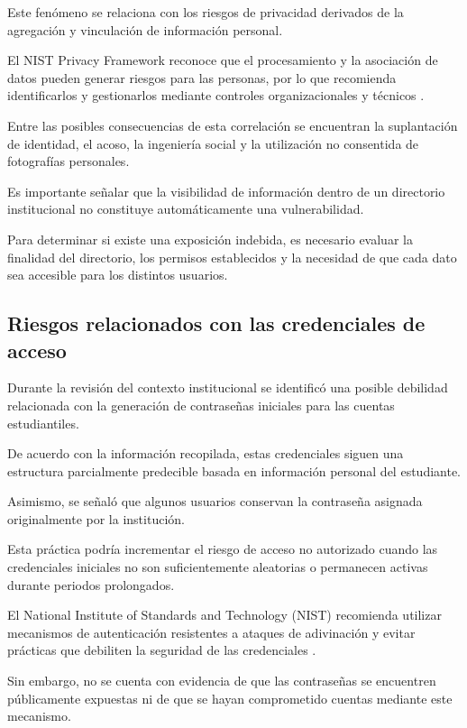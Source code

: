 \documentclass[12pt]{article}
\begin{document}
Este fenómeno se relaciona con los riesgos
de privacidad derivados de la agregación
y vinculación de información personal.

El NIST Privacy Framework reconoce
que el procesamiento y la asociación
de datos pueden generar riesgos para
las personas, por lo que recomienda
identificarlos y gestionarlos mediante
controles organizacionales y técnicos
\parencite{nistprivacy}.

Entre las posibles consecuencias de
esta correlación se encuentran la
suplantación de identidad, el acoso,
la ingeniería social y la utilización
no consentida de fotografías personales.

Es importante señalar que la visibilidad
de información dentro de un directorio
institucional no constituye automáticamente
una vulnerabilidad.

Para determinar si existe una exposición
indebida, es necesario evaluar la finalidad
del directorio, los permisos establecidos
y la necesidad de que cada dato sea
accesible para los distintos usuarios.


\subsection{Riesgos relacionados con
las credenciales de acceso}

Durante la revisión del contexto
institucional se identificó una posible
debilidad relacionada con la generación
de contraseñas iniciales para las
cuentas estudiantiles.

De acuerdo con la información recopilada,
estas credenciales siguen una estructura
parcialmente predecible basada en
información personal del estudiante.

Asimismo, se señaló que algunos usuarios
conservan la contraseña asignada
originalmente por la institución.

Esta práctica podría incrementar el riesgo
de acceso no autorizado cuando las
credenciales iniciales no son suficientemente
aleatorias o permanecen activas durante
periodos prolongados.

El National Institute of Standards and
Technology (NIST) recomienda utilizar
mecanismos de autenticación resistentes
a ataques de adivinación y evitar
prácticas que debiliten la seguridad
de las credenciales
\parencite{nist80063b}.

Sin embargo, no se cuenta con evidencia
de que las contraseñas se encuentren
públicamente expuestas ni de que se
hayan comprometido cuentas mediante
este mecanismo.
\end{document}
